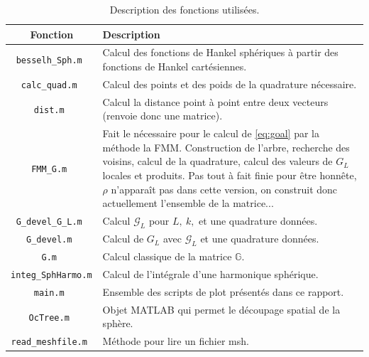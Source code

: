 \documentclass[11pt]{article}
\newcommand{\lG}{\mathcal{G}}
\newcommand{\Gm}{\mathbb{G}}
\begin{document}
\begin{table}
  \centering
  \begin{tabular}{|c|p{}|}
    \hline
    Fonction                      & Description                                                                              \\ 
    \hline \hline
    \texttt{besselh\_Sph.m    }   & Calcul des fonctions de Hankel sphériques à partir des fonctions de Hankel cartésiennes. \\
    \hline
    \texttt{calc\_quad.m      }   & Calcul des points et des poids de la quadrature nécessaire.                              \\
    \hline
    \texttt{dist.m           }    & Calcul la distance point à point entre deux vecteurs (renvoie donc une matrice).         \\
    \hline
    \texttt{FMM\_G.m          }   & Fait le nécessaire pour le calcul de \autoref{eq:goal} par la méthode la FMM. Construction de l'arbre, recherche des
                                 voisins, calcul de la quadrature, calcul des valeurs de $G_L$ locales et produits. Pas tout à fait finie
                                 pour être honnête, $\rho$ n'apparaît pas dans cette version, on construit donc actuellement l'ensemble de la
                                 matrice...                                                                                 \\
    \hline
    \texttt{G\_devel\_G\_L.m    } & Calcul $\lG_L$ pour $L,~k,$ et une quadrature données.                                   \\
    \hline
    \texttt{G\_devel.m        }   & Calcul de $G_L$ avec $\lG_L$ et une quadrature données.                                  \\
    \hline
    \texttt{G.m              }    & Calcul classique de la matrice $\Gm$.                                                    \\
    \hline
    \texttt{integ\_SphHarmo.m }   & Calcul de l'intégrale d'une harmonique sphérique.                                        \\
    \hline
    \texttt{main.m           }    & Ensemble des scripts de plot présentés dans ce rapport.                                  \\
    \hline
    \texttt{OcTree.m         }    & Objet MATLAB qui permet le découpage spatial de la sphère.                               \\
    \hline
    \texttt{read\_meshfile.m  }   & Méthode pour lire un fichier msh.                                                        \\
    \hline
  \end{tabular}
  \caption{Description des fonctions utilisées.}
  \label{tab:funcs}
\end{table}
\end{document}
